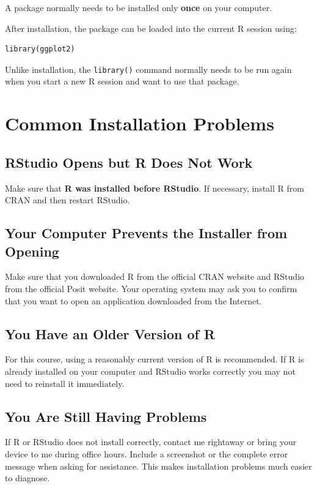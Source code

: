 \documentclass[11pt]{article}
\begin{document}
A package normally needs to be installed only \textbf{once} on your computer.

After installation, the package can be loaded into the current R session using:

\begin{lstlisting}
library(ggplot2)
\end{lstlisting}

Unlike installation, the \texttt{library()} command normally needs to be run again when you start a new R session and want to use that package.


\section{Common Installation Problems}

\subsection{RStudio Opens but R Does Not Work}
Make sure that \textbf{R was installed before RStudio}. If necessary, install R from CRAN and then restart RStudio.

\subsection{Your Computer Prevents the Installer from Opening}
Make sure that you downloaded R from the official CRAN website and RStudio from the official Posit website. Your operating system may ask you to confirm that you want to open an application downloaded from the Internet.

\subsection{You Have an Older Version of R}
For this course, using a reasonably current version of R is recommended. If R is already installed on your computer and RStudio works correctly you may not need to reinstall it immediately.

\subsection{You Are Still Having Problems}
If R or RStudio does not install correctly, contact me rightaway or bring your device to me during office hours. Include a screenshot or the complete error message when asking for assistance. This makes installation problems much easier to diagnose.
\end{document}
